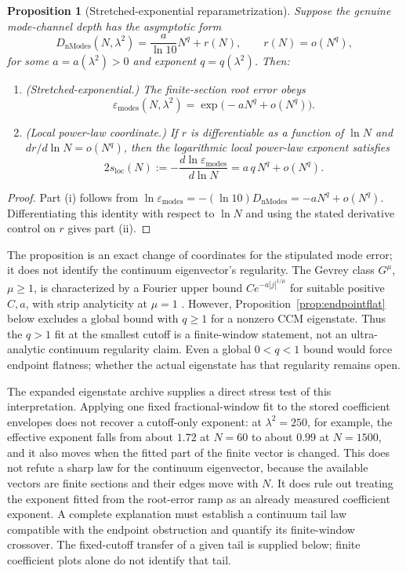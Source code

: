 \documentclass[11pt,a4paper]{article}
\newtheorem{proposition}{Proposition}
\begin{document}
\begin{proposition}[Stretched-exponential reparametrization]\label{prop:stretched}
Suppose the genuine mode-channel depth has the asymptotic form
\[
 D_{\mathrm{nModes}}(N,\lambda^2)
 =\frac{a}{\ln 10}N^q+r(N),
 \qquad r(N)=o(N^q),
\]
for some $a=a(\lambda^2)>0$ and exponent $q=q(\lambda^2)$. Then:
\begin{enumerate}
\item[(i)] \emph{(Stretched-exponential.)} The finite-section root error obeys
  \[
  \varepsilon_{\mathrm{modes}}(N,\lambda^2)
  =\exp\!\bigl(-aN^q+o(N^q)\bigr).
  \]
\item[(ii)] \emph{(Local power-law coordinate.)} If $r$ is differentiable as a
function of $\ln N$ and $d r/d\ln N=o(N^q)$, then the logarithmic local
power-law exponent satisfies
  \[
  2s_{\mathrm{loc}}(N)
  :=-\frac{d\ln\varepsilon_{\mathrm{modes}}}{d\ln N}
  =a\,q\,N^q+o(N^q).
  \]
\end{enumerate}
\end{proposition}
\begin{proof}
Part (i) follows from
$\ln\varepsilon_{\mathrm{modes}}=-(\ln10)D_{\mathrm{nModes}}
=-aN^q+o(N^q)$. Differentiating this identity with respect to $\ln N$
and using the stated derivative control on $r$ gives part (ii).
\end{proof}

The proposition is an exact change of coordinates for the stipulated mode
error; it does not identify the continuum eigenvector's regularity.
The Gevrey class $G^\mu$, $\mu\ge1$, is characterized by a Fourier upper
bound $Ce^{-a|j|^{1/\mu}}$ for suitable positive $C,a$, with strip analyticity
at $\mu=1$ \cite{Rodino1993,ToftNabizadeh2017}. However,
Proposition~\ref{prop:endpointflat} below excludes a global bound with
$q\ge1$ for a nonzero CCM eigenstate. Thus the $q>1$ fit at the smallest
cutoff is a finite-window statement, not an ultra-analytic continuum
regularity claim. Even a global $0<q<1$ bound would force endpoint flatness;
whether the actual eigenstate has that regularity remains open.

The expanded eigenstate archive supplies a direct stress test of this
interpretation. Applying one fixed fractional-window fit to the stored
coefficient envelopes does not recover a cutoff-only exponent: at
$\lambda^2=250$, for example, the effective exponent falls from about $1.72$
at $N=60$ to about $0.99$ at $N=1500$, and it also moves when the fitted part
of the finite vector is changed. This does not refute a sharp law for the
continuum eigenvector, because the available vectors are finite sections and
their edges move with $N$. It does rule out treating the exponent fitted from
the root-error ramp as an already measured coefficient exponent. A complete explanation must establish a continuum tail law compatible with
the endpoint obstruction and quantify its finite-window crossover. The
fixed-cutoff transfer of a given tail is supplied below; finite coefficient
plots alone do not identify that tail.
\end{document}
